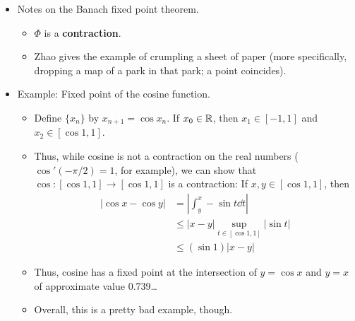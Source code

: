 \documentclass[../notes.tex]{subfiles}
\begin{document}
\begin{itemize}
\begin{proof}
\begin{align*}
            &\leq d(x,x_n)+d(x_n,x_{n+1})+q\cdot d(x_n,x)\\
            &= (1+q)\cdot d(x,x_n)+d(x_n,x_{n+1})
        \end{align*}
        where the first term converges since $\{x_n\}$ is convergent and the second term converges since $\{x_n\}$ is Cauchy. Thus, $d(x,\Phi(x))\to 0$ as $n\to\infty$, so $x=\Phi(x)$, as desired.\par
        Lastly, we prove that $x$ is unique. Suppose that there exists $y\in X$ such that $y=\Phi(y)$. Then
        \begin{equation*}
            d(x,y) = d(\Phi(x),\Phi(y))
            \leq q\cdot d(x,y)
        \end{equation*}
        It follows that $d(x,y)\leq q^n\cdot d(x,y)$, i.e., that $d(x,y)\to 0$ as $n\to\infty$. Therefore, we must have that $d(x,y)=0$, from which it follows that $x=y$, as desired.
    \end{proof}
    \item Notes on the Banach fixed point theorem.
    \begin{itemize}
        \item $\Phi$ is a \textbf{contraction}.
        \item Zhao gives the example of crumpling a sheet of paper (more specifically, dropping a map of a park in that park; a point coincides).
    \end{itemize}
    \item Example: Fixed point of the cosine function.
    \begin{itemize}
        \item Define $\{x_n\}$ by $x_{n+1}=\cos x_n$. If $x_0\in\mathbb{R}$, then $x_1\in[-1,1]$ and $x_2\in[\cos 1,1]$.
        \item Thus, while cosine is not a contraction on the real numbers ($\cos'(-\pi/2)=1$, for example), we can show that $\cos:[\cos 1,1]\to[\cos 1,1]$ is a contraction: If $x,y\in[\cos 1,1]$, then
        \begin{align*}
            |\cos x-\cos y| &= \left| \int_y^x-\sin t\dd{t} \right|\\
            &\leq |x-y|\sup_{t\in[\cos 1,1]}|\sin t|\\
            &\leq (\sin 1)|x-y|
        \end{align*}
        \item Thus, cosine has a fixed point at the intersection of $y=\cos x$ and $y=x$ of approximate value 0.739\dots
        \item Overall, this is a pretty bad example, though.

\end{itemize}
\end{itemize}
\end{document}
